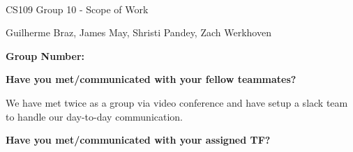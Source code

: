 \documentclass[11pt]{article}
\begin{document}
	
\renewcommand*\rmdefault{phv}
\selectfont

\newcommand{\avg}[1]{\left<{#1}\right>}
\newcommand{\hence}{\hspace{1cm}\Longrightarrow\hspace{1cm}}
\renewcommand{\ni}{\noindent}
\newcommand{\din}{\indent \indent}
\newcommand{\mni}{\medskip \noindent}
\newcommand{\bni}{\bigskip \noindent}
\newcommand{\sni}{\smallskip \noindent}
\newcommand{\pr}{{\rm Prob}}
\newcommand{\mon}{\begin{displaymath}}
\newcommand{\moff}{\end{displaymath}}
\newcommand{\sumi}[1]{\sum_{{#1}=-\infty}^{\infty}}
\renewcommand{\b}[1]{\mbox{\boldmath ${#1}$}}
\newcommand{\sumy}{\sum_{\b{y}}}
\newcommand{\sumz}{\sum_{\b{z}}}
\newcommand{\pd}[2]{\frac{\partial {#1}}{\partial {#2}}}
\newcommand{\od}[2]{\frac{d {#1}}{d {#2}}}
\newcommand{\odat}[3]{\left. \frac{d {#1}}{d {#2}} \right|_{#3}}
\newcommand{\inti}{\int_{-\infty}^{\infty}}
\newcommand{\eon}{\begin{equation}}
\newcommand{\eoff}{\end{equation}}
\newcommand{\eaon}{\begin{eqnarray}}
\newcommand{\eaoff}{\end{eqnarray}}
\newcommand{\e}[1]{\times 10^{#1}}
\newcommand{\chem}[2]{{}^{#2} \mathrm{#1}}
\renewcommand{\sb}{s}
\newcommand{\s}{s}
\newcommand{\zetaexp}{\left( \zeta e^{q \s t} \right)}
\newcommand{\taunuc}{\tau_{nuc}}
\newcommand{\eq}[1]{Eq. (\ref{#1})}\
\newcommand{\ev}[1]{\langle #1 \rangle}
\newcommand*\mean[1]{${\bar{#1}}$}


\begin{center}
\Large CS109 Group 10 - Scope of Work
\end{center}
\begin{center}
\small Guilherme Braz, James May, Shristi Pandey, Zach Werkhoven
\end{center}

\textbf{Group Number:} \newline

\textbf{Have you met/communicated with your fellow teammates?}

We have met twice as a group via video conference and have setup a slack team to handle our day-to-day communication.
\vspace*{0.3cm}

\textbf{Have you met/communicated with your assigned TF?}
\end{document}
